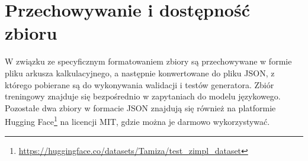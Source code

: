 \section{Przechowywanie i dostępność zbioru}

W związku ze specyficznym formatowaniem zbiory są przechowywane w formie pliku arkusza kalkulacyjnego, a następnie konwertowane do pliku JSON, z którego pobierane są do wykonywania walidacji i testów generatora. Zbiór treningowy znajduje się bezpośrednio w zapytaniach do modelu językowego. Pozostałe dwa zbiory w formacie JSON znajdują się również na platformie Hugging Face\footnote{\label{fn:dataset:link}\url{https://huggingface.co/datasets/Tamiza/test_zimpl_dataset}} na licencji MIT, gdzie można je darmowo wykorzystywać. %